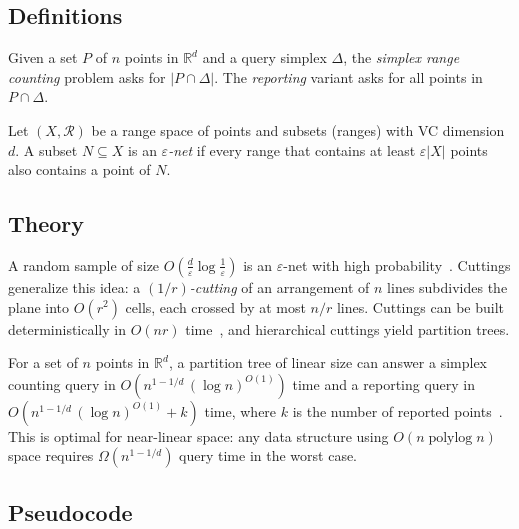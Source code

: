 \subsection{Definitions}

\begin{definition}\label{def:simplex_range_counting}
Given a set $P$ of $n$ points in $\mathbb{R}^d$ and a query simplex $\Delta$,
the \emph{simplex range counting} problem asks for $|P \cap \Delta|$. The
\emph{reporting} variant asks for all points in $P \cap \Delta$.
\end{definition}

\begin{definition}\label{def:eps_net}
Let $(X, \mathcal{R})$ be a range space of points and subsets (ranges) with VC
dimension $d$. A subset $N \subseteq X$ is an \emph{$\varepsilon$-net} if every
range that contains at least $\varepsilon |X|$ points also contains a point of
$N$.
\end{definition}

\subsection{Theory}
A random sample of size $O(\frac{d}{\varepsilon}\log\frac{1}{\varepsilon})$ is
an $\varepsilon$-net with high probability~\cite{hausslerwelzl1987}. Cuttings
generalize this idea: a \emph{$(1/r)$-cutting} of an arrangement of $n$ lines
subdivides the plane into $O(r^2)$ cells, each crossed by at most $n/r$ lines.
Cuttings can be built deterministically in $O(nr)$ time~\cite{chazellefriedman1990},
and hierarchical cuttings yield partition trees.

\begin{theorem}\label{thm:simplex_range_searching}
For a set of $n$ points in $\mathbb{R}^d$, a partition tree of linear size can
answer a simplex counting query in $O(n^{1-1/d}\,(\log n)^{O(1)})$ time and a
reporting query in $O(n^{1-1/d}\,(\log n)^{O(1)} + k)$ time, where $k$ is the
number of reported points~\cite{matousek1992,chazellefriedman1990}.
This is optimal for near-linear space: any data structure using $O(n
\operatorname{polylog} n)$ space requires $\Omega(n^{1-1/d})$ query time in
the worst case.
\end{theorem}

\subsection{Pseudocode}


